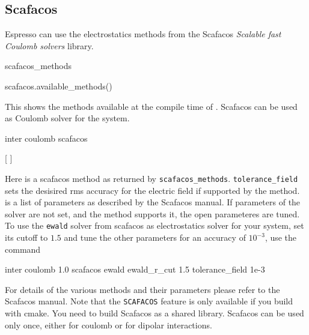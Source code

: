 \subsection{Scafacos}
Espresso can use the electrostatics methods from the Scafacos \emph{Scalable fast Coulomb solvers} library.
\begin{essyntax}
  scafacos_methods
  \begin{features}
  \end{features}
\end{essyntax}
\begin{pysyntax}
scafacos.available_methods()
  \begin{features}
  \end{features}
\end{pysyntax}
This shows the methods available at the compile time of \es{}.
Scafacos can be used as Coulomb solver for the system.
\begin{essyntax}
  inter coulomb  scafacos   
  \begin{features}
  \end{features}
\end{essyntax}
\begin{pysyntax}
	[
	]
	\begin{features}
	\end{features}
\end{pysyntax}
Here  is a scafacos method as returned by \texttt{scafacos_methods}. 
\texttt{tolerance_field} sets the desisired rms accuracy for the electric field if supported by the method.
 is a list of parameters as described by the Scafacos manual. If parameters of the solver
are not set, and the method supports it, the open parameteres are tuned.
To use the \texttt{ewald} solver from scafacos as electrostatics solver for your system, set its cutoff
to $1.5$ and tune the other parameters for an accuracy of $10^{-3}$, use the command
\begin{tclcode}
  inter coulomb 1.0 scafacos ewald ewald_r_cut 1.5 tolerance_field 1e-3
\end{tclcode}
For details of the various methods and their parameters please refer to the Scafacos manual.
Note that the \texttt{SCAFACOS} feature is only available if you build with cmake. You need
to build Scafacos as a shared library.
Scafacos can be used only once, either for coulomb or for dipolar interactions.

